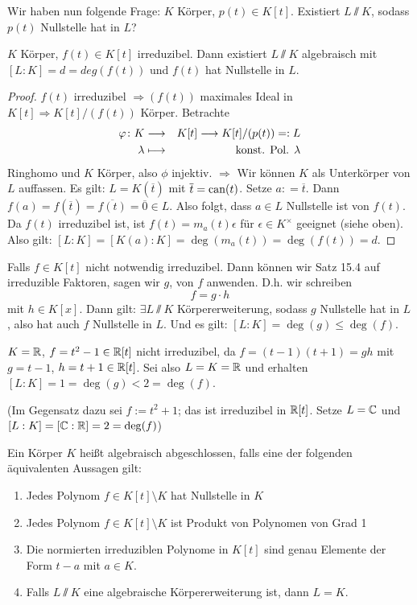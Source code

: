 \documentclass[12pt,a4paper]{scrartcl}
\begin{document}
Wir haben nun folgende Frage: $K$ Körper, $p(t)\in K[t]$. Existiert $L\sslash K$, sodass $p(t)$ Nullstelle hat in $L$?

\begin{satz} \label{thm:15.4}
	$K$ Körper, $f(t)\in K[t]$ irreduzibel. Dann existiert $L\sslash K$ algebraisch mit $[L:K]  = d = deg(f(t))$ und $f(t)$ hat Nullstelle in $L$.
\end{satz}
\begin{proof}
	$f(t)$ irreduzibel $\Rightarrow (f(t))$ maximales Ideal in $K[t] \Rightarrow K[t]/(f(t))$ Körper. Betrachte 
	\begin{eqnarray*}
	\varphi\colon K&\longrightarrow& K[t]\longrightarrow K[t]/(p(t)) = : L\\
	\lambda &\longmapsto & \text{konst. Pol. }\lambda
	\end{eqnarray*}
	Ringhomo und $K$ Körper, also $\phi$ injektiv.
	$\Rightarrow$ Wir können $K$ als Unterkörper von $L$ auffassen. Es gilt: $L = K(\overline{t})$ mit $\overline{t}  = \operatorname{can} (t)$. Setze $a: = \overline{t}$. Dann $f(a) = f(\overline{t}) = \overline{f(t)} = \overline{0}\in L$. Also folgt, dass $a\in L$ Nullstelle ist von $f(t)$. Da $f(t)$ irreduzibel ist, ist $f(t) = m_a(t)\epsilon$ für $\epsilon \in K^{\times}$ geeignet (siehe oben). Also gilt: $[L:K] = [K(a):K] = \deg(m_a(t)) = \deg(f(t)) = d$.
\end{proof}	



\begin{bem}
	Falls $f\in K[t]$ nicht notwendig irreduzibel. Dann können wir Satz 15.4 auf irreduzible Faktoren, sagen wir $g$, von $f$ anwenden. D.h. wir schreiben
	$$f = g\cdot h$$ mit $h \in K[x]$. Dann gilt: $\exists L\sslash K$ Körpererweiterung, sodass $g$ Nullstelle hat in $L$, also hat auch $f$ Nullstelle in $L$. Und es gilt: $[L:K] = \deg(g)\leq \deg (f)$.
\end{bem}
\begin{bsp} $K = \mathbb R$, $f= t^2-1\in \mathbb R[t]$ nicht irreduzibel, da $f = (t-1)(t+1) = gh$ mit $g = t-1$, $h = t+1\in\mathbb R[t]$. Sei also $L = K = \mathbb R$ und erhalten $[L:K] = 1 = \deg(g)<2 = \deg(f)$.

(Im Gegensatz dazu sei $f := t^2+1$; das ist irreduzibel in $\mathbb R[t]$. Setze $L =\mathbb C$ und $[L:K] = [\mathbb C:\mathbb R] = 2 = \deg(f)$)
\end{bsp}
	
\begin{satz}\label{thm:algab}
	Ein Körper $K$ heißt algebraisch abgeschlossen, falls eine der folgenden äquivalenten Aussagen gilt:
	\begin{enumerate}
		\item Jedes Polynom $f\in K[t]\setminus K$ hat Nullstelle in $K$
		\item Jedes Polynom $f\in K[t]\setminus K$ ist Produkt von Polynomen von Grad 1
		\item Die normierten irreduziblen Polynome in $K[t]$ sind genau Elemente der Form $t-a$ mit $a\in K$.
		\item Falls $L\sslash K$ eine algebraische Körpererweiterung ist, dann $L = K$.
	\end{enumerate}
\end{satz}	
\end{document}
